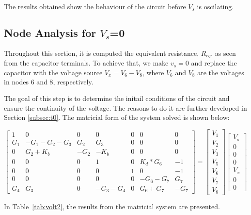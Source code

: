 The results obtained show the behaviour of the circuit before $V_s$ is oscilating.

\subsection{Node Analysis for $V_s$=0}
\label{subsec:vs=0}

Throughout this section, it is computed the equivalent resistance, $R_{eq}$, as seen from
the capacitor terminals. To achieve that, we make $v_{s}=0$ and replace the capacitor
with the voltage source $V_{x}=V_{6}-V_{8}$, where $V_6$ and $V_8$ are the voltages
in nodes 6 and 8, respectively.\par
The goal of this step is to determine the initail conditions of the circuit and ensure the continuity of the voltage. The reasons to do it are further developed in Section \ref{subsec:t0}.
The matricial form of the system solved is shown below:\par

$$
\begin{bmatrix}
  1 & 0 & 0 & 0 & 0 & 0 & 0 \\
  G_{1} & -G_{1}-G_{2}-G_{3} & G_{2} & G_{3} & 0 & 0 & 0 \\
  0 & G_{2}+K_{b} & -G_{2} & -K_{b} & 0 & 0 & 0 \\
  0 & 0 & 0 & 1 & 0 & K_{d}*G_{6} & -1 \\
  0 & 0 & 0 & 0 & 1 & 0 & -1 \\
  0 & 0 & 0 & 0 & 0 & -G_{6}-G_{7} & G_{7} \\
  G_{4} & G_{3} & 0 & -G_{3}-G_{4} & 0 & G_{6}+G_{7} & -G_{7}
\end{bmatrix}
=
\begin{bmatrix}
  V_{1}\\
  V_{2}\\
  V_{3}\\
  V_{5}\\
  V_{6}\\
  V_{7}\\
  V_{8}
\end{bmatrix}
\begin{bmatrix}
  V_{s}\\
  0\\
  0\\
  0\\
  V_{x}\\
  0\\
  0
\end{bmatrix}
$$

In Table~\ref{tab:volt2}, the results from the matricial system are presented.\par


